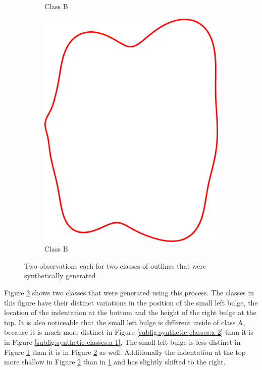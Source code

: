 \documentclass[pdftex,12pt,a4paper]{report}
\begin{document}
\begin{figure}[h]
\begin{subfigure}[b]{0.24\textwidth}
		\caption{Class B}
		\label{subfig:synthetic-classes:b-1}
	\end{subfigure}
	\begin{subfigure}[b]{0.24\textwidth}
		\centering
		\includegraphics[width=.9\linewidth]{img/synthetic-generation/classes/2-2.pdf}
		\caption{Class B}
		\label{subfig:synthetic-classes:b-2}
	\end{subfigure}
	\caption{Two observations each for two classes of outlines that were synthetically generated}
	\label{fig:synthetic-classes}
\end{figure}

Figure \ref{fig:synthetic-classes} shows two classes that were generated using this process. The classes in this figure have their distinct variations in the position of the small left bulge, the location of the indentation at the bottom and the height of the right bulge at the top. It is also noticeable that the small left bulge is different inside of class A, because it is much more distinct in Figure \ref{subfig:synthetic-classes:a-2} than it is in Figure \ref{subfig:synthetic-classes:a-1}. The small left bulge is less distinct in Figure \ref{subfig:synthetic-classes:b-1} than it is in Figure \ref{subfig:synthetic-classes:b-2} as well. Additionally the indentation at the top more shallow in Figure \ref{subfig:synthetic-classes:b-2} than in \ref{subfig:synthetic-classes:b-1} and has slightly shifted to the right. 
\end{document}
